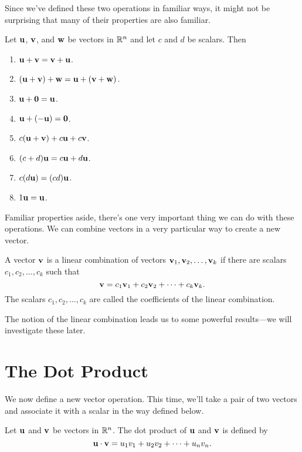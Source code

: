 \documentclass[../m73main.tex]{subfiles}
\begin{document}
Since we've defined these two operations in familiar ways, it might not be surprising that many of their properties are also familiar.

\begin{theorem}
	Let $\mathbf{u}$, $\mathbf{v}$, and $\mathbf{w}$ be vectors in $\mathbb{R}^n$ and let $c$ and $d$ be scalars.
	Then
	\begin{enumerate}[label=(\alph*)]
		\item $\mathbf{u} + \mathbf{v} = \mathbf{v} + \mathbf{u}$.
		\item $(\mathbf{u} + \mathbf{v}) + \mathbf{w} = \mathbf{u} + (\mathbf{v} + \mathbf{w})$.
		\item $\mathbf{u} + \mathbf{0} = \mathbf{u}$.
		\item $\mathbf{u} + (-\mathbf{u}) = \mathbf{0}$.
		\item $c(\mathbf{u} + \mathbf{v}) + c \mathbf{u} + c \mathbf{v}$.
		\item $(c + d) \mathbf{u} = c \mathbf{u} + d \mathbf{u}$.
		\item $c(d \mathbf{u}) = (cd) \mathbf{u}$.
		\item $1 \mathbf{u} = \mathbf{u}$.
	\end{enumerate}
\end{theorem}

Familiar properties aside, there's one very important thing we can do with these operations.
We can combine vectors in a very particular way to create a new vector.

\begin{definition}
	A vector $\mathbf{v}$ is a linear combination of vectors $\mathbf{v}_1, \mathbf{v}_2, \ldots, \mathbf{v}_k$ if there are scalars $c_1, c_2, \ldots, c_k$ such that
	\[ \mathbf{v} = c_1 \mathbf{v}_1 + c_2 \mathbf{v}_2 + \cdots + c_k \mathbf{v}_k. \]
	The scalars $c_1, c_2, \ldots, c_k$ are called the coefficients of the linear combination.
\end{definition}

The notion of the linear combination leads us to some powerful results---we will investigate these later.

\section{The Dot Product}
We now define a new vector operation.
This time, we'll take a pair of two vectors and associate it with a scalar in the way defined below.

\begin{definition}
	Let $\mathbf{u}$ and $\mathbf{v}$ be vectors in $\mathbb{R}^n$.
	The dot product of $\mathbf{u}$ and $\mathbf{v}$ is defined by
	\[ \mathbf{u} \cdot \mathbf{v} = u_1 v_1 + u_2 v_2 + \cdots + u_n v_n. \]
\end{definition}
\end{document}
